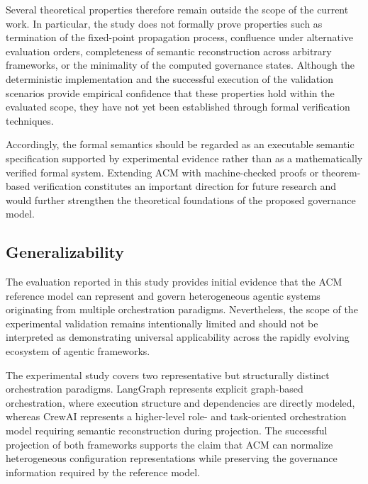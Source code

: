 \documentclass[10pt]{article}
\begin{document}
Several theoretical properties therefore remain outside the scope of the current work. In particular, the study does not formally prove properties such as termination of the fixed-point propagation process, confluence under alternative evaluation orders, completeness of semantic reconstruction across arbitrary frameworks, or the minimality of the computed governance states. Although the deterministic implementation and the successful execution of the validation scenarios provide empirical confidence that these properties hold within the evaluated scope, they have not yet been established through formal verification techniques.

Accordingly, the formal semantics should be regarded as an executable semantic specification supported by experimental evidence rather than as a mathematically verified formal system. Extending ACM with machine-checked proofs or theorem-based verification constitutes an important direction for future research and would further strengthen the theoretical foundations of the proposed governance model.

\subsection{Generalizability}
\label{sec:generalizability}

The evaluation reported in this study provides initial evidence that the ACM reference model can represent and govern heterogeneous agentic systems originating from multiple orchestration paradigms. Nevertheless, the scope of the experimental validation remains intentionally limited and should not be interpreted as demonstrating universal applicability across the rapidly evolving ecosystem of agentic frameworks.

The experimental study covers two representative but structurally distinct orchestration paradigms. LangGraph represents explicit graph-based orchestration, where execution structure and dependencies are directly modeled, whereas CrewAI represents a higher-level role- and task-oriented orchestration model requiring semantic reconstruction during projection. The successful projection of both frameworks supports the claim that ACM can normalize heterogeneous configuration representations while preserving the governance information required by the reference model.
\end{document}
